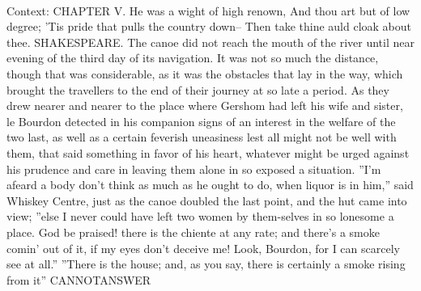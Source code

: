 \documentclass[11pt,a4paper, onecolumn]{article}
\begin{document}
\\ Context: CHAPTER V. He was a wight of high renown, And thou art but of low degree; 'Tis pride that pulls the country down-- Then take thine auld cloak about thee. SHAKESPEARE. The canoe did not reach the mouth of the river until near evening of the third day of its navigation. It was not so much the distance, though that was considerable, as it was the obstacles that lay in the way, which brought the travellers to the end of their journey at so late a period. As they drew nearer and nearer to the place where Gershom had left his wife and sister, le Bourdon detected in his companion signs of an interest in the welfare of the two last, as well as a certain feverish uneasiness lest all might not be well with them, that said something in favor of his heart, whatever might be urged against his prudence and care in leaving them alone in so exposed a situation. ''I'm afeard a body don't think as much as he ought to do, when liquor is in him,'' said Whiskey Centre, just as the canoe doubled the last point, and the hut came into view; ''else I never could have left two women by them-selves in so lonesome a place. God be praised! there is the chiente at any rate; and there's a smoke comin' out of it, if my eyes don't deceive me! Look, Bourdon, for I can scarcely see at all.'' ''There is the house; and, as you say, there is certainly a smoke rising from it'' CANNOTANSWER
\end{document}
